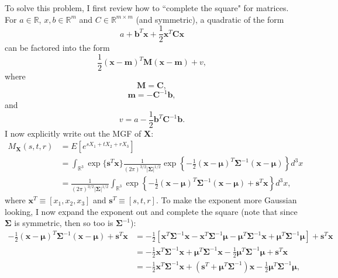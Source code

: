 \begin{problem}{16}  To solve this problem, I first review how to ``complete the square" for matrices.  For $a \in \mathbb R$, $x, b \in \mathbb R^{m}$ and $C \in \mathbb R^{m \times m}$ (and symmetric), a quadratic of the form
\begin{equation*}
a+{\bm b}^T{\bm x} + \frac{1}{2}{\bm x}^T \bm C {\bm x}
\end{equation*}
can be factored into the form
\begin{equation*}
\frac{1}{2}({\bm x}-{\bm m})^T \bm M ({\bm x}-{\bm m})+v,
\end{equation*}
where 
\begin{equation*}
\bm M= \bm C,
\end{equation*}
\begin{equation*}
{\bm m}=-\bm C^{-1}{\bm b},
\end{equation*}
and
\begin{equation*}
v = a-\frac{1}{2} {\bm b}^T \bm C^{-1} {\bm b}.
\end{equation*}
I now explicitly write out the MGF of $\bm X$:
\begin{align*}
M_{\bm X}(s, t, r) &= E[e^{sX_1+tX_2+rX_3}] \\
& = \int_{\mathbb R^3} \exp \{ \bm s^T \bm x \}\frac{1}{(2 \pi)^{3/2} |\bm \Sigma|^{1/2}} \exp \left \{-\frac{1}{2}(\bm x-\bm \mu)^T \bm \Sigma^{-1}(\bm x-\bm \mu) \right \}d^3x\\
& =\frac{1}{(2 \pi)^{3/2} |\bm \Sigma|^{1/2}} \int_{\mathbb R^3}  \exp \left \{ -\frac{1}{2}(\bm x-\bm \mu)^T \bm \Sigma^{-1}(\bm x-\bm \mu) + \bm s^T \bm x\right \}d^3x,
\end{align*}
where $\bm x^T \equiv [x_1, x_2, x_3]$ and $\bm s^T \equiv[s, t, r]$.  To make the exponent more Gaussian looking, I now expand the exponent out and complete the square (note that since $\bm \Sigma$ is symmetric, then so too is $\bm \Sigma^{-1}$):
\begin{align*}
-\frac{1}{2}(\bm x-\bm \mu)^T \bm \Sigma^{-1}(\bm x-\bm \mu) + \bm s^T \bm x & = -\frac{1}{2}\left [ \bm x^T \bm \Sigma^{-1}\bm x -\bm x^T \bm \Sigma^{-1}\bm \mu-\bm \mu^T \bm \Sigma^{-1}\bm x  +\bm \mu^T \bm \Sigma^{-1}\bm \mu  \right ] + \bm s^T \bm x \\
 & = -\frac{1}{2} \bm x^T \bm \Sigma^{-1}\bm x +\bm \mu^T \bm \Sigma^{-1}\bm x  -\frac{1}{2} \bm \mu^T \bm \Sigma^{-1}\bm \mu + \bm s^T \bm x \\
  & = -\frac{1}{2} \bm x^T \bm \Sigma^{-1}\bm x +(\bm s^T+ \bm \mu^T \bm \Sigma^{-1})\bm x  -\frac{1}{2} \bm \mu^T \bm \Sigma^{-1}\bm \mu,

\end{align*}
\end{problem}
